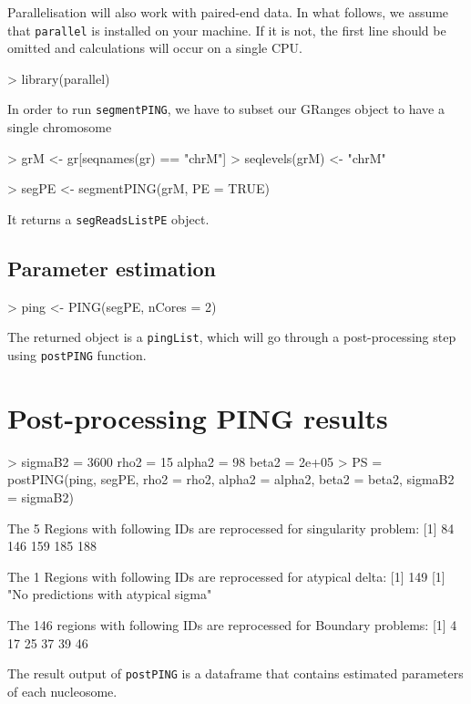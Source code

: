 \documentclass[11pt]{article}
\begin{document}
Parallelisation will also work with paired-end data. In what follows, we assume that \texttt{parallel} is installed on your machine. If it is not, the first line should be omitted and calculations will occur on a single CPU.

\begin{Schunk}
\begin{Sinput}
> library(parallel)
\end{Sinput}
\end{Schunk}

In order to run \texttt{segmentPING}, we have to subset our GRanges object to have a single chromosome
\begin{Schunk}
\begin{Sinput}
> grM <- gr[seqnames(gr) == "chrM"]
> seqlevels(grM) <- "chrM"
\end{Sinput}
\end{Schunk}

\begin{Schunk}
\begin{Sinput}
> segPE <- segmentPING(grM, PE = TRUE)
\end{Sinput}
\end{Schunk}

It returns a \texttt{segReadsListPE} object.


\subsection{Parameter estimation}

\begin{Schunk}
\begin{Sinput}
> ping <- PING(segPE, nCores = 2)
\end{Sinput}
\end{Schunk}
The returned object is a \texttt{pingList}, which will go through a post-processing step using \texttt{postPING} function.


\section{Post-processing PING results}

\begin{Schunk}
\begin{Sinput}
> {
     sigmaB2 = 3600
     rho2 = 15
     alpha2 = 98
     beta2 = 2e+05
 }
> PS = postPING(ping, segPE, rho2 = rho2, alpha2 = alpha2, beta2 = beta2, 
     sigmaB2 = sigmaB2)
\end{Sinput}
\begin{Soutput}
 The 5 Regions with following IDs are reprocessed for singularity problem: 
[1]  84 146 159 185 188

 The 1 Regions with following IDs are reprocessed for atypical delta: 
[1] 149
[1] "No predictions with atypical sigma"

 The 146 regions with following IDs are reprocessed for Boundary problems: 
[1]  4 17 25 37 39 46
\end{Soutput}
\end{Schunk}
The result output of \texttt{postPING} is a dataframe that contains estimated parameters of each nucleosome.
\end{document}
